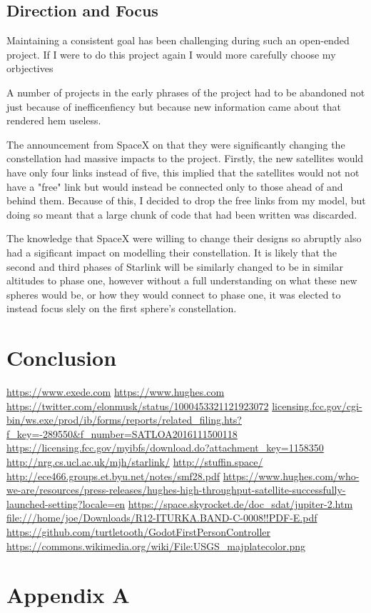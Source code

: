 \documentclass[12pt]{article}
\begin{document}
\subsection{Direction and Focus}

Maintaining a consistent goal has been challenging during such an open-ended project. If I were to do this project again I would more carefully choose my orbjectives %

A number of projects in the early phrases of the project had to be abandoned not just because of inefficenfiency but because new information came about that rendered hem useless.

The announcement from SpaceX on that they were significantly changing the constellation had massive impacts to the project. Firstly, the new satellites would have only four links instead of five, this implied that the satellites would not not have a "free" link but would instead be connected only to those ahead of and behind them. Because of this, I decided to drop the free links from my model, but doing so meant that a large chunk of code that had been written was discarded.

The knowledge that SpaceX were willing to change their designs so abruptly also had a sigificant impact on modelling their constellation. It is likely that the second and third phases of Starlink will be similarly changed to be in similar altitudes to phase one, however without a full understanding on what these new spheres would be, or how they would connect to phase one, it was elected to instead focus slely on the first sphere's constellation. %

\section{Conclusion}


\begin{thebibliography}{99}
	 \url{https://www.exede.com}
	 \url{https://www.hughes.com}
	 \url{https://twitter.com/elonmusk/status/1000453321121923072}
	 \url{licensing.fcc.gov/cgi-bin/ws.exe/prod/ib/forms/reports/related_filing.hts?f_key=-289550&f_number=SATLOA2016111500118}
	 \url{https://licensing.fcc.gov/myibfs/download.do?attachment_key=1158350}
	 \url{http://nrg.cs.ucl.ac.uk/mjh/starlink/}
	 \url{http://stuffin.space/}
	 \url{http://ece466.groups.et.byu.net/notes/smf28.pdf}
	 \url{https://www.hughes.com/who-we-are/resources/press-releases/hughes-high-throughput-satellite-successfully-launched-setting?locale=en}
	 \url{https://space.skyrocket.de/doc_sdat/jupiter-2.htm}
	 \url{file:///home/joe/Downloads/R12-ITURKA.BAND-C-0008!!PDF-E.pdf}
	 \url{https://github.com/turtletooth/GodotFirstPersonController}
	 \url{https://commons.wikimedia.org/wiki/File:USGS_majplatecolor.png}
\end{thebibliography}
\appendix

\section{Appendix A}

\printindex

\end{document}
